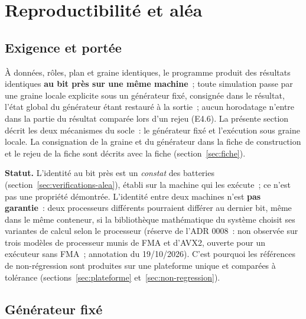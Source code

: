 \documentclass[a4paper,11pt]{article}
\begin{document}
\section{Reproductibilité et aléa}
\label{sec:reproductibilite}

\subsection{Exigence et portée}
\label{sec:reproductibilite-exigence}

À données, rôles, plan et graine identiques, le programme produit des
résultats identiques \textbf{au bit près sur une même machine}~; toute
simulation passe par une graine locale explicite sous un générateur fixé,
consignée dans le résultat, l'état global du générateur étant restauré à la
sortie~; aucun horodatage n'entre dans la partie du résultat comparée lors
d'un rejeu (E4.6). La présente section décrit les deux mécanismes du socle~:
le générateur fixé et l'exécution sous graine locale. La consignation de la
graine et du générateur dans la fiche de construction et le rejeu de la fiche
sont décrits avec la fiche (section~\ref{sec:fiche}).

\begin{encadre}
\small
\textbf{Statut.} L'identité au bit près est un \emph{constat} des batteries
(section~\ref{sec:verifications-alea}), établi sur la machine qui les exécute~;
ce n'est pas une propriété démontrée. L'identité entre deux machines n'est
\textbf{pas garantie}~: deux processeurs différents pourraient différer au
dernier bit, même dans le même conteneur, si la bibliothèque mathématique
du système choisit ses variantes de calcul selon le processeur (réserve de
l'ADR 0008~: non observée sur trois modèles de processeur munis de FMA et
d'AVX2, ouverte pour un exécuteur sans FMA~; annotation du 19/10/2026). C'est pourquoi les références de non-régression
sont produites sur une plateforme unique et comparées à tolérance
(sections~\ref{sec:plateforme} et~\ref{sec:non-regression}).
\end{encadre}

\subsection{Générateur fixé}
\label{sec:generateur}
\end{document}
